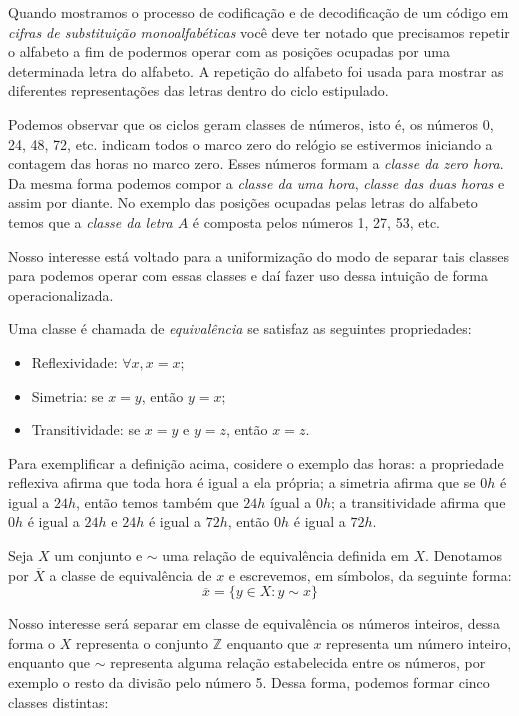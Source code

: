Quando mostramos o processo de codifica\c{c}\~ao e de decodifica\c{c}\~ao de um c\'odigo em 
\textit{cifras de substitui\c{c}\~ao monoalfab\'eticas} voc\^e deve ter notado que precisamos repetir o alfabeto a fim de podermos operar com as posi\c{c}\~oes ocupadas por uma determinada letra do alfabeto. A repeti\c{c}\~ao do alfabeto foi usada para mostrar as diferentes representa\c{c}\~oes das letras dentro do ciclo estipulado.

Podemos observar que os ciclos geram classes de n\'umeros, isto \'e, os n\'umeros 0, 24, 48, 72, etc. indicam todos o marco zero do rel\'ogio se estivermos iniciando a contagem das horas no marco zero. Esses n\'umeros formam a \textsl{classe da zero hora}. Da mesma forma podemos compor a \textsl{classe da uma hora}, \textsl{classe das duas horas} e assim por diante. No exemplo das posi\c{c}\~oes ocupadas pelas letras do alfabeto temos que a \textsl{classe da letra $A$} \'e composta pelos n\'umeros 1, 27, 53, etc. 

Nosso interesse est\'a voltado para a uniformiza\c{c}\~ao do modo de separar tais classes para podemos operar com essas classes e da\'i fazer uso dessa intui\c{c}\~ao de forma operacionalizada. 

\begin{Df}
	Uma classe \'e chamada de \textsl{equival\^encia} se satisfaz as seguintes propriedades:
	\begin{itemize}
		\item Reflexividade: $\forall x, x=x$; 		
		\item Simetria: se $x=y$, ent\~ao $y=x$; 
		\item Transitividade: se $x=y$ e $y=z$, ent\~ao $x=z$.
	\end{itemize}
\end{Df}   

Para exemplificar a defini\c{c}\~ao acima, cosidere o exemplo das horas: a propriedade reflexiva afirma que toda hora \'e igual a ela pr\'opria; a simetria afirma que se $0h$ \'e igual a $24h$, ent\~ao temos tamb\'em que $24h$ \' igual a $0h$; a transitividade afirma que $0h$ \'e igual a $24h$ e $24h$ \'e igual a $72h$, então $0h$ \'e igual a $72h$.

Seja $X$ um conjunto e $\sim$ uma rela\c{c}\~ao de equival\^encia definida em $X$. Denotamos por $\overline{X}$ a classe de equival\^encia de $x$ e escrevemos, em s\'imbolos, da seguinte forma:	
	                     $$\overline{x}=\{y\in X: y\sim x\}$$

Nosso interesse ser\'a separar em classe de equival\^encia os n\'umeros inteiros, dessa forma o $X$ representa o conjunto $\mathbb{Z}$ enquanto que $x$ representa um n\'umero inteiro, enquanto que $\sim$ representa alguma rela\c{c}\~ao estabelecida entre os n\'umeros, por exemplo o resto da divis\~ao pelo n\'umero 5. Dessa forma, podemos formar cinco classes distintas:

